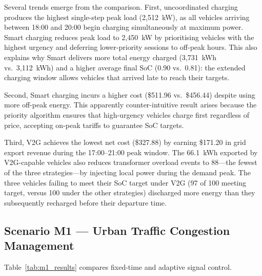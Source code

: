 Several trends emerge from the comparison. First, uncoordinated charging produces the highest single-step peak load (2{,}512~kW), as all vehicles arriving between 18:00 and 20:00 begin charging simultaneously at maximum power. Smart charging reduces peak load to 2{,}450~kW by prioritising vehicles with the highest urgency and deferring lower-priority sessions to off-peak hours. This also explains why Smart delivers more total energy charged (3{,}731~kWh vs.\ 3{,}112~kWh) and a higher average final SoC (0.90 vs.\ 0.81): the extended charging window allows vehicles that arrived late to reach their targets.

Second, Smart charging incurs a higher cost (\$511.96 vs.\ \$456.44) despite using more off-peak energy. This apparently counter-intuitive result arises because the priority algorithm ensures that high-urgency vehicles charge first regardless of price, accepting on-peak tariffs to guarantee SoC targets.

Third, V2G achieves the lowest net cost (\$327.88) by earning \$171.20 in grid export revenue during the 17:00--21:00 peak window. The 66.1~kWh exported by V2G-capable vehicles also reduces transformer overload events to 88---the fewest of the three strategies---by injecting local power during the demand peak. The three vehicles failing to meet their SoC target under V2G (97 of 100 meeting target, versus 100 under the other strategies) discharged more energy than they subsequently recharged before their departure time.

\subsection{Scenario M1 --- Urban Traffic Congestion Management}

Table~\ref{tab:m1_results} compares fixed-time and adaptive signal control.

